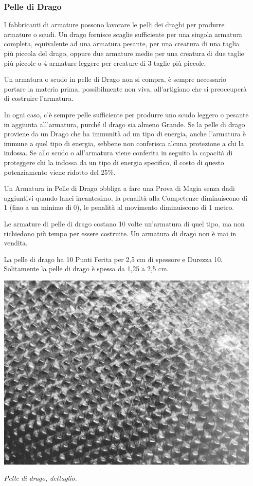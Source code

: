 \begin{multicols}{2}
\subsubsection{Pelle di Drago}

\label{pelle-di-drago}

I fabbricanti di armature possono lavorare le pelli dei draghi per produrre armature o scudi.
Un drago fornisce scaglie sufficiente per una singola armatura completa, equivalente ad una armatura pesante, per una creatura di una taglia più piccola del drago, oppure due armature medie per una creatura di due taglie più piccole o 4 armature leggere per creature di 3 taglie più piccole.

Un armatura o scudo in pelle di Drago non si compra, è sempre necessario portare la materia prima, possibilmente non viva, all'artigiano che si preoccuperà di costruire l'armatura.

In ogni caso, c'è sempre pelle sufficiente per produrre uno scudo leggero o pesante in aggiunta all'armatura, purché il drago sia almeno Grande.
Se la pelle di drago proviene da un Drago che ha immunità ad un tipo di energia, anche l'armatura è immune a quel tipo di energia, sebbene non conferisca alcuna protezione a chi la indossa. Se allo scudo o all'armatura viene conferita in seguito la capacità di proteggere chi la indossa da un tipo di energia specifico, il costo di questo potenziamento viene ridotto del 25\%.

Un Armatura in Pelle di Drago obbliga a fare una Prova di Magia senza dadi aggiuntivi quando lanci incantesimo, la penalità alla Competenze diminuiscono di 1 (fino a un minimo di 0), le penalità al movimento diminuiscono di 1 metro.

Le armature di pelle di drago costano 10 volte un'armatura di quel tipo, ma non richiedono più tempo per essere costruite. Un armatura di drago non è mai in vendita.

La pelle di drago ha 10 Punti Ferita per 2,5 cm di spessore e Durezza 10. Solitamente la pelle di drago è spessa da 1,25 a 2,5 cm.

\end{multicols}

\vfill

\begin{center}
\includegraphics[width=0.6\linewidth]{immagini/dragonhide.png}

\emph{Pelle di drago, dettaglio.}
\end{center}



\pagebreak

